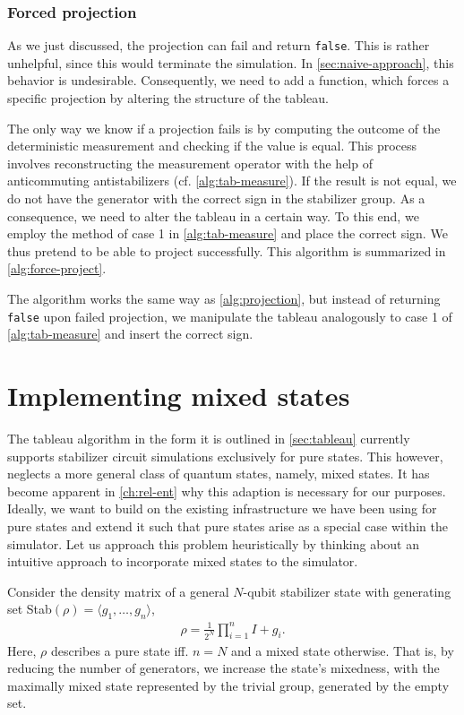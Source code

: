 \subsubsection{Forced projection}
As we just discussed, the projection can fail and return \verb|false|. This is rather
unhelpful, since this would terminate the simulation. In
\cref{sec:naive-approach}, this behavior is undesirable. Consequently, we need
to add a function, which forces a specific projection by altering the structure
of the tableau.

The only way we know if a projection fails is by computing the outcome of the
deterministic measurement and checking if the value is equal. This process
involves reconstructing the measurement operator with the help of anticommuting
antistabilizers (cf. \cref{alg:tab-measure}). If the result is not equal, we do
not have the generator with the correct sign in the stabilizer group. As a
consequence, we need to alter the tableau in a certain way. To this end, we
employ the method of case 1 in \cref{alg:tab-measure} and place the correct
sign. We thus pretend to be able to project successfully. This algorithm is
summarized in \cref{alg:force-project}.
\begin{alg}\label{alg:force-project}
  The algorithm works the same way as \cref{alg:projection}, but instead of
  returning \verb|false| upon failed projection, we manipulate the tableau
  analogously to case 1 of \cref{alg:tab-measure} and insert the correct sign.  
\end{alg}
\section{Implementing mixed states}\label{sec:mixed-states}
The tableau algorithm in the form it is outlined in \cref{sec:tableau}
currently supports stabilizer circuit simulations exclusively for pure states.
This however,
neglects a more general class of quantum states, namely, mixed states. It has
become apparent in \cref{ch:rel-ent} why this adaption is necessary for our
purposes. Ideally, we want to build on the existing infrastructure we have been
using for pure states and extend it such that pure states arise as a special
case within the simulator. 
Let us approach this problem
heuristically by thinking about an intuitive approach to incorporate mixed
states to the simulator.

Consider the density matrix of a general $N$-qubit stabilizer
state with generating set Stab$\left( \rho \right) = \langle g_1, \ldots, g_n
\rangle$,
\begin{align}
  \rho = \frac{1}{2^N} \prod_{i=1}^n I + g_i
.\end{align}
Here, $\rho$ describes a pure state iff. $n=N$ and a mixed state otherwise.
That is, by reducing the number of generators, we increase the state's
mixedness, with the maximally mixed state represented by the trivial group,
generated by the empty set.

